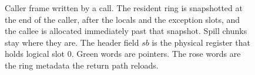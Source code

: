 \begin{figure}[t]
\caption{Caller frame written by a call.
The resident ring is snapshotted at the end of the caller, after the locals and the exception slots, and the callee is allocated immediately past that snapshot.
Spill chunks stay where they are.
The header field $sb$ is the physical register that holds logical slot 0.
Green words are pointers.
The rose words are the ring metadata the return path reloads.}
\label{fig:frame}
\end{figure}
